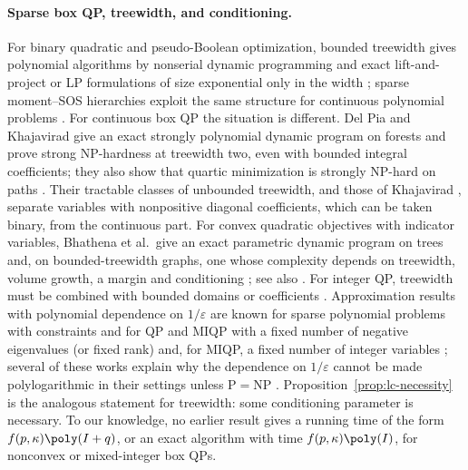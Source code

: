 \paragraph{Sparse box QP, treewidth, and conditioning.}
For binary quadratic and pseudo-Boolean optimization, bounded treewidth
gives polynomial algorithms by nonserial dynamic programming
\cite{BerteleBrioschi1972,CramaHansenJaumard1990,Dechter1999} and exact
lift-and-project or LP formulations of size exponential only in the width
\cite{BienstockOzbay2004,WainwrightJordan2004,Laurent2009}; sparse
moment--SOS hierarchies exploit the same structure for continuous
polynomial problems \cite{WakiEtAl2006,Lasserre2006}. For continuous box QP
the situation is different. Del Pia and Khajavirad give an exact strongly
polynomial dynamic program on forests and prove strong NP-hardness at
treewidth two, even with bounded integral coefficients; they also show
that quartic minimization is strongly NP-hard on paths
\cite[Theorems~1--3]{DelPiaKhajavirad2026}. Their tractable classes of
unbounded treewidth, and those of Khajavirad
\cite{Khajavirad2026Poly}, separate variables with nonpositive diagonal
coefficients, which can be taken binary, from the continuous part. For
convex quadratic objectives with indicator variables, Bhathena et al.\
give an exact parametric dynamic program on trees
\cite{BhathenaEtAl2026Trees} and, on bounded-treewidth graphs, one whose
complexity depends on treewidth, volume growth, a margin and conditioning
\cite{BhathenaEtAl2026Graphs}; see also \cite{BienstockChen2024}. For integer QP, treewidth must be combined with
bounded domains or coefficients \cite{EibenEtAl2019,GanianOrdyniak2018,Lokshtanov2015}.
Approximation results with polynomial dependence on $1/\varepsilon$ are
known for sparse polynomial problems with constraints
\cite[Theorem~4]{BienstockMunoz2018} and for QP and MIQP with a fixed number of negative eigenvalues (or
fixed rank) and, for MIQP, a fixed number of integer variables
\cite{Vavasis1992,DelPia2023,DelPia2026Jacobi};
several of these works explain why the dependence on $1/\varepsilon$
cannot be made polylogarithmic in their settings unless
$\mathrm P=\mathrm{NP}$ \cite{BienstockMunoz2018,Vavasis1992,DelPia2026Jacobi}.
Proposition~\ref{prop:lc-necessity} is the analogous statement for
treewidth: some conditioning parameter is necessary. To our knowledge, no
earlier result gives a running time of the form
$f(p,\kappa)\poly(I+q)$, or an exact algorithm with time
$f(p,\kappa)\poly(I)$, for nonconvex or mixed-integer box QPs.

